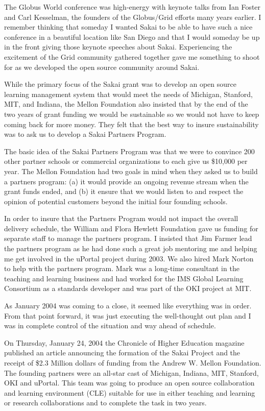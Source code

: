 \documentclass[12pt]{book}
\begin{document}
The Globus World conference was high-energy with keynote talks from Ian Foster
and Carl Kesselman, the founders of the Globus\slash Grid efforts many years
earlier.  I remember thinking that someday I wanted Sakai to be able to have
such a nice conference in a beautiful location like San Diego and that I would
someday be up in the front giving those keynote speeches about Sakai.  Experiencing
the excitement of the Grid community gathered together gave me something
to shoot for as we developed the open source community around Sakai.

While the primary focus of the Sakai grant was to develop an open source learning
management system that would meet the needs of Michigan, Stanford, MIT, and Indiana,
the Mellon Foundation also insisted that by the end of the two years of grant
funding we would be sustainable so we would not have to keep coming back for more
money.  They felt that the best way to insure sustainability was to ask us to
develop a Sakai Partners Program.

The basic idea of the Sakai Partners Program was that we were to convince 200 other
partner schools or commercial organizations to each give us \$10,000 per year.
The Mellon Foundation had two goals in mind
when they asked us to build a partners program: (a) it would provide an ongoing revenue
stream when the grant funds ended, and (b) it ensure that we would listen to
and respect the opinion of potential customers beyond the initial four
founding schools.

In order to insure that the Partners Program would not impact the overall delivery
schedule, the William and Flora Hewlett Foundation gave us funding for separate
staff to manage the partners program.  I insisted that Jim Farmer lead the partners
program as he had done such a great job mentoring me and helping me get involved
in the uPortal project during 2003.  We also hired Mark Norton to help with the
partners program.  Mark was a long-time consultant in the teaching and learning business
and had worked for the IMS Global Learning Consortium as a standards developer and
was part of the OKI project at MIT.

As January 2004 was coming to a close, it seemed like everything was
in order.   From that point forward, it was just executing the
well-thought out plan and I was in complete control of the situation and
way ahead of schedule.

On Thursday, January 24, 2004 the Chronicle of Higher Education magazine
published an article announcing the formation of the Sakai
Project and the receipt of \$2.3 Million dollars of funding from the
Andrew W. Mellon Foundation.  The founding partners were an all-star cast of
Michigan, Indiana, MIT, Stanford, OKI and uPortal. This team was going to produce
an open source collaboration and learning environment (CLE) suitable for use
in either teaching and learning or research collaborations and to complete the task
in two years.
\end{document}
